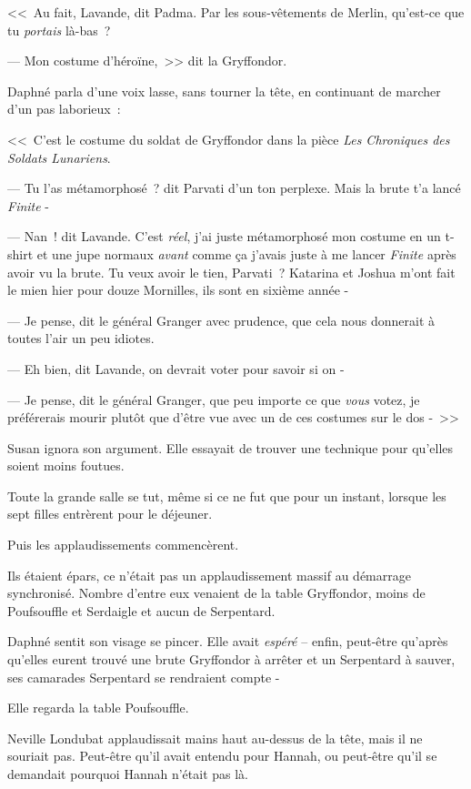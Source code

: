 <<~Au fait, Lavande, dit Padma. Par les sous-vêtements de Merlin, qu'est-ce que tu \emph{portais} là-bas~?

--- Mon costume d'héroïne,~>> dit la Gryffondor.

Daphné parla d'une voix lasse, sans tourner la tête, en continuant de marcher d'un pas laborieux~:

<<~C'est le costume du soldat de Gryffondor dans la pièce \emph{Les Chroniques des Soldats Lunariens}.

--- Tu l'as métamorphosé~? dit Parvati d'un ton perplexe. Mais la brute t'a lancé \emph{Finite} -

--- Nan~! dit Lavande. C'est \emph{réel}, j'ai juste métamorphosé mon costume en un t-shirt et une jupe normaux \emph{avant} comme ça j'avais juste à me lancer \emph{Finite} après avoir vu la brute. Tu veux avoir le tien, Parvati~? Katarina et Joshua m'ont fait le mien hier pour douze Mornilles, ils sont en sixième année -

--- Je pense, dit le général Granger avec prudence, que cela nous donnerait à toutes l'air un peu idiotes.

--- Eh bien, dit Lavande, on devrait voter pour savoir si on -

--- Je pense, dit le général Granger, que peu importe ce que \emph{vous} votez, je préférerais mourir plutôt que d'être vue avec un de ces costumes sur le dos -~>>

Susan ignora son argument. Elle essayait de trouver une technique pour qu'elles soient moins foutues.

\later

Toute la grande salle se tut, même si ce ne fut que pour un instant, lorsque les sept filles entrèrent pour le déjeuner.

Puis les applaudissements commencèrent.

Ils étaient épars, ce n'était pas un applaudissement massif au démarrage synchronisé. Nombre d'entre eux venaient de la table Gryffondor, moins de Poufsouffle et Serdaigle et aucun de Serpentard.

Daphné sentit son visage se pincer. Elle avait \emph{espéré} -- enfin, peut-être qu'après qu'elles eurent trouvé une brute Gryffondor à arrêter et un Serpentard à sauver, ses camarades Serpentard se rendraient compte -

Elle regarda la table Poufsouffle.

Neville Londubat applaudissait mains haut au-dessus de la tête, mais il ne souriait pas. Peut-être qu'il avait entendu pour Hannah, ou peut-être qu'il se demandait pourquoi Hannah n'était pas là.

